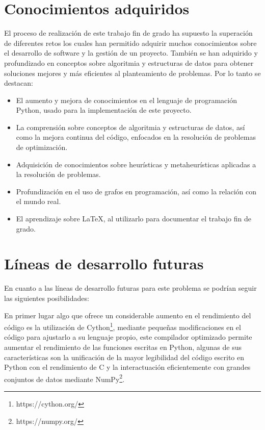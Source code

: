 
\section{Conocimientos adquiridos}

El proceso de realización de este trabajo fin de grado ha supuesto la superación de diferentes retos los cuales han permitido adquirir muchos conocimientos sobre el desarrollo de software y la gestión de un proyecto. También se han adquirido y profundizado en conceptos sobre algoritmia y estructuras de datos para obtener soluciones mejores y más eficientes al planteamiento de problemas. Por lo tanto se destacan:

\begin{itemize}
  \item El aumento y mejora de conocimientos en el lenguaje de programación Python, usado para la implementación de este proyecto.
  \item La comprensión sobre conceptos de algoritmia y estructuras de datos, así como la mejora continua del código, enfocados en la resolución de problemas de optimización.
  \item Adquisición de conocimientos sobre heurísticas y metaheurísticas aplicadas a la resolución de problemas.
  \item Profundización en el uso de grafos en programación, así como la relación con el mundo real.
  \item El aprendizaje sobre \LaTeX, al utilizarlo para documentar el trabajo fin de grado.
\end{itemize}

\section{Líneas de desarrollo futuras}
En cuanto a las líneas de desarrollo futuras para este problema se podrían seguir las siguientes posibilidades:

En primer lugar algo que ofrece un considerable aumento en el rendimiento del código es la utilización de Cython\footnote{https://cython.org/}, mediante pequeñas modificaciones en el código para ajustarlo a su lenguaje propio, este compilador optimizado permite aumentar el  rendimiento de las funciones escritas en Python, algunas de sus características son la unificación de la mayor legibilidad del código escrito en Python con el rendimiento de C y la interactuación eficientemente con grandes conjuntos de datos mediante NumPy\footnote{https://numpy.org/}.

